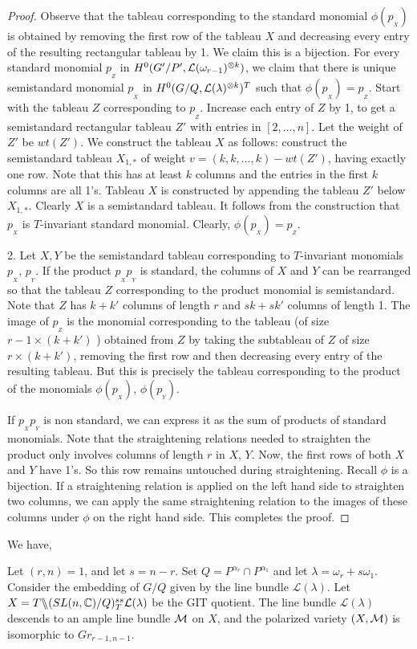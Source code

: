 \begin{proof}
    Observe that the tableau corresponding to the standard monomial \(\phi(p_{_X})\) is obtained by removing the first row of the tableau \(X\) and decreasing every entry of the resulting rectangular tableau by 1. We claim this is a bijection. For every standard monomial \(p_{_Z}\) in \(H^0(G'/P', {\cal L}(\omega_{r-1})^{\otimes k})\), we claim that there is unique semistandard monomial \(p_{_X}\) in \(H^0(G/Q,{\cal L}(\lambda)^{\otimes k})^T\) such that \(\phi(p_{_X})=p_{_Z}\). Start with the tableau $Z$ corresponding to  \(p_{_Z}\). Increase each entry of $Z$ by 1, to get a semistandard rectangular tableau $Z'$ with entries in $[2,\ldots,n]$. Let the weight of $Z'$ be $wt(Z')$.  We construct the tableau \(X\) as follows: construct the semistandard tableau \(X_{1,*}\) of weight \(v = (k,k,...,k) - wt(Z')\), having exactly one row. Note that this has at least $k$ columns and the entries in the first $k$ columns are all 1's. Tableau \(X\) is constructed by appending the tableau \(Z'\) below \(X_{1,*}\). Clearly $X$ is a semistandard tableau. It follows from the construction that \(p_{_X}\) is \(T\)-invariant standard monomial. Clearly, \(\phi(p_{_X}) = p_{_Z}\).

2. Let $X, Y$ be the semistandard tableau corresponding to $T$-invariant monomials $p_{_X}$, $p_{_Y}$.  If the product $p_{_X}p_{_Y}$ is standard, the columns of
$X$ and $Y$ can be rearranged so that the tableau $Z$ corresponding to the product monomial is semistandard. Note that $Z$ has $k+k'$ columns of
    length $r$ and $sk+sk'$ columns of length 1. The image of $p_{_Z}$ is the monomial corresponding to the tableau (of size $r-1 \times (k+k')$ ) obtained from $Z$ by taking the subtableau of $Z$ of size $r \times (k+k')$, removing the first row and then decreasing every entry of the resulting tableau. But this is precisely the tableau corresponding to the product of
the monomials $\phi(p_{_X})$, $\phi(p_{_Y})$.

If $p_{_X}p_{_Y}$ is non standard, we can express it as the sum of products of 
standard monomials. Note that the straightening relations needed to straighten the product only involves columns of length $r$ in $X$, $Y$. Now, the first rows of both $X$ and $Y$ have 1's. So this row remains untouched during straightening. Recall $\phi$ is a bijection. If a straightening relation is applied on the left hand side to straighten two columns, we can apply the same straightening relation to the images of these columns under $\phi$ on the right hand side.  This completes the proof.
\end{proof}
We have,
\begin{theorem}
Let $(r,n)=1$, and let $s=n-r$. Set $Q = P^{\alpha_r} \cap P^{\alpha_1}$ and let $\lambda = \omega_r + s\omega_1$. Consider the embedding of $G/Q$ given by the line bundle ${\mathcal L}(\lambda)$. Let $X = T \backslash\mkern-6mu\backslash (SL(n,\mathbb{C})/Q)^{ss}_T {\cal L}(\lambda)$ be the GIT quotient. The line bundle ${\mathcal L}(\lambda)$ descends to an ample line bundle ${\cal M}$ on $X$, and the polarized variety $(X,{\cal M})$ is isomorphic to $Gr_{r-1, n-1}$.

\end{theorem}

